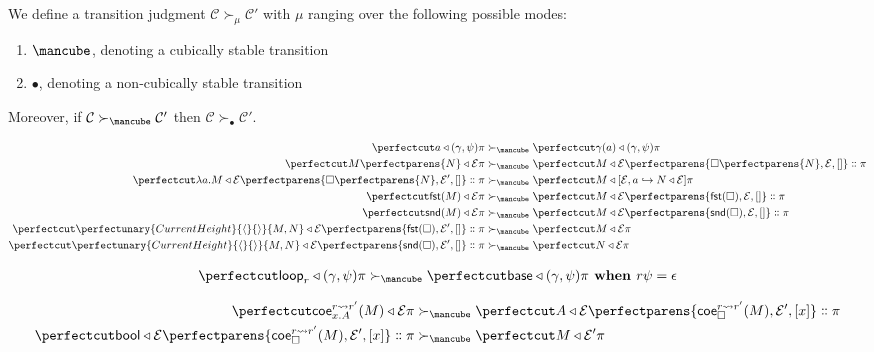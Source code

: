 \documentclass{article}
\newcommand\Clo[2]{#1\triangleleft{#2}}
\newcommand\Coe[4]{\mathsf{coe}^{#1\leadsto{#2}}_{#3} (#4)}
\newcommand\Lam[2]{\lambda{#1}.{#2}}
\newcommand\Fst[1]{\mathsf{fst} (#1)}
\newcommand\Snd[1]{\mathsf{snd} (#1)}
\newcommand\Loop[1]{\mathsf{loop}_{#1}}
\newcommand\Base{\mathsf{base}}
\newcommand\Cons[2]{{#1}\dblcolon{#2}}
\newcommand\Bool{\mathsf{bool}}
\newcommand\Frame[3]{\perfectparens{#1,#2,#3}}
\newcommand\Cfg[3]{\cut{\Clo{#1}{#2}}{#3}}
\newcommand\App[2]{{#1}\perfectparens{#2}}
\newcommand\Pair[2]{\perfectunary{CurrentHeight}{\langle}{\rangle}{#1,#2}}
\newcommand\Stable{\text{\mancube}}
\newcommand\NonStable{\bullet}
\newcommand\Step[3]{{#2}\mathrel{\succ_{#1}}{#3}}
\newcommand\AStep[3]{{#2}&\mathrel{\succ_{#1}}{#3}}
\newcommand\AStepSt[2]{\AStep{\Stable}{#1}{#2}}
\begin{document}
We define a transition judgment
$\Step{\mu}{\mathcal{C}}{\mathcal{C}'}$ with $\mu$ ranging over
the following possible modes:
\begin{enumerate}
\item $\Stable$, denoting a cubically stable transition
\item $\NonStable$, denoting a non-cubically stable transition
\end{enumerate}

Moreover, if $\Step{\Stable}{\mathcal{C}}{\mathcal{C}'}$ then
$\Step{\NonStable}{\mathcal{C}}{\mathcal{C}'}$.


\begin{align}
  \AStepSt{
    \Cfg{a}{(\gamma,\psi)}{\pi}
  }{
    \Cfg{\gamma(a)}{(\gamma,\psi)}{\pi}
  }
  \\
  \AStepSt{
    \Cfg{\App{M}{N}}{\mathcal{E}}{\pi}
  }{
    \Cfg{M}{\mathcal{E}}{\Cons{\Frame{\App{\Box}{N}}{\mathcal{E}}{[]}}{\pi}}
  }
  \\
  \AStepSt{
    \Cfg{\Lam{a}{M}}{\mathcal{E}}{\Cons{\Frame{\App{\Box}{N}}{\mathcal{E}'}{[]}}{\pi}}
  }{
    \Cfg{M}{[\mathcal{E},a\hookrightarrow{\Clo{N}{\mathcal{E}}}]}{\pi}
  }
  \\
  \AStepSt{
    \Cfg{\Fst{M}}{\mathcal{E}}{\pi}
  }{
    \Cfg{M}{\mathcal{E}}{\Cons{\Frame{\Fst{\Box}}{\mathcal{E}}{[]}}{\pi}}
  }
  \\
  \AStepSt{
    \Cfg{\Snd{M}}{\mathcal{E}}{\pi}
  }{
    \Cfg{M}{\mathcal{E}}{\Cons{\Frame{\Snd{\Box}}{\mathcal{E}}{[]}}{\pi}}
  }
  \\
  \AStepSt{
    \Cfg{\Pair{M}{N}}{\mathcal{E}}{\Cons{\Frame{\Fst{\Box}}{\mathcal{E}'}{[]}}{\pi}}
  }{
    \Cfg{M}{\mathcal{E}}{\pi}
  }
  \\
  \AStepSt{
    \Cfg{\Pair{M}{N}}{\mathcal{E}}{\Cons{\Frame{\Snd{\Box}}{\mathcal{E}'}{[]}}{\pi}}
  }{
    \Cfg{N}{\mathcal{E}}{\pi}
  }
\end{align}

\begin{align}
  \AStepSt{
    \Cfg{\Loop{r}}{(\gamma,\psi)}{\pi}
  }{
    \Cfg{\Base}{(\gamma,\psi)}{\pi}
  }
  \textbf{ when } r\psi = \epsilon
  \\
\end{align}

\begin{align}
  \AStepSt{
    \Cfg{\Coe{r}{r'}{x.A}{M}}{\mathcal{E}}{\pi}
  }{
    \Cfg{A}{\mathcal{E}}{
      \Cons{
        \Frame{\Coe{r}{r'}{\Box}{M}}{\mathcal{E}'}{[x]}
      }{\pi}
    }
  }
  \\
  \AStepSt{
    \Cfg{\Bool}{\mathcal{E}}{
      \Cons{\Frame{\Coe{r}{r'}{\Box}{M}}{\mathcal{E}'}{[x]}}{\pi}
    }
  }{
    \Cfg{M}{\mathcal{E}'}{\pi}
  }
\end{align}
\end{document}

